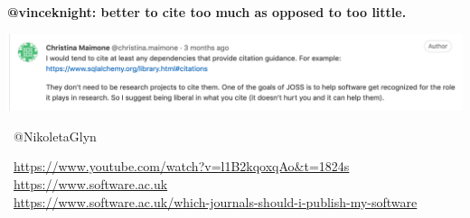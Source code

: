 \documentclass{beamer}
\begin{document}
\begin{frame}
    \centering
    \textbf{@vinceknight: better to cite too much as opposed to too little.}
    \vspace{1cm}
    \pause

    \includegraphics[width=\textwidth]{static/cite.png}
\end{frame}

\begin{frame}
    \begin{center}
        \small
    \faTwitter \ @NikoletaGlyn \\
    \vspace{.75cm}

    \ \url{https://www.youtube.com/watch?v=l1B2kqoxqAo&t=1824s} \\
    \ \url{https://www.software.ac.uk} \\
    \ \url{https://www.software.ac.uk/which-journals-should-i-publish-my-software} \\
    \end{center}
\end{frame}
\end{document}
